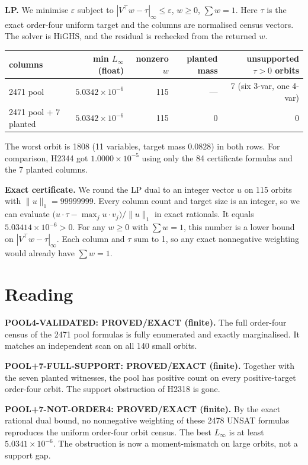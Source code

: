 \documentclass[11pt]{article}
\begin{document}
\textbf{LP.} We minimise $\varepsilon$ subject to $|V^{\top}w-\tau|_\infty\le\varepsilon$, $w\ge0$, $\sum w=1$. Here $\tau$ is the exact order-four uniform target and the columns are normalised census vectors. The solver is HiGHS, and the residual is rechecked from the returned $w$.
\begin{center}\begin{tabular}{lrrrr}\toprule
columns & min $L_\infty$ (float) & nonzero $w$ & planted mass & unsupported $\tau>0$ orbits\\\midrule
2471 pool & $5.0342\times10^{-6}$ & 115 & --- & 7 (six 3-var, one 4-var)\\
2471 pool + 7 planted & $5.0342\times10^{-6}$ & 115 & 0 & 0\\\bottomrule
\end{tabular}\end{center}
The worst orbit is 1808 (11 variables, target mass $0.0828$) in both rows. For comparison, H2344 got $1.0000\times10^{-5}$ using only the 84 certificate formulas and the 7 planted columns.

\textbf{Exact certificate.} We round the LP dual to an integer vector $u$ on 115 orbits with $\|u\|_1=99999999$. Every column count and target size is an integer, so we can evaluate $\bigl(u\cdot\tau-\max_j u\cdot v_j\bigr)/\|u\|_1$ in exact rationals. It equals $5.03414\times10^{-6}>0$. For any $w\ge0$ with $\sum w=1$, this number is a lower bound on $|V^{\top}w-\tau|_\infty$. Each column and $\tau$ sum to 1, so any exact nonnegative weighting would already have $\sum w=1$.

\section*{Reading}
\textbf{POOL4-VALIDATED: PROVED/EXACT (finite).} The full order-four census of the 2471 pool formulas is fully enumerated and exactly marginalised. It matches an independent scan on all 140 small orbits.

\textbf{POOL+7-FULL-SUPPORT: PROVED/EXACT (finite).} Together with the seven planted witnesses, the pool has positive count on every positive-target order-four orbit. The support obstruction of H2318 is gone.

\textbf{POOL+7-NOT-ORDER4: PROVED/EXACT (finite).} By the exact rational dual bound, no nonnegative weighting of these 2478 UNSAT formulas reproduces the uniform order-four orbit census. The best $L_\infty$ is at least $5.0341\times10^{-6}$. The obstruction is now a moment-mismatch on large orbits, not a support gap.
\end{document}
